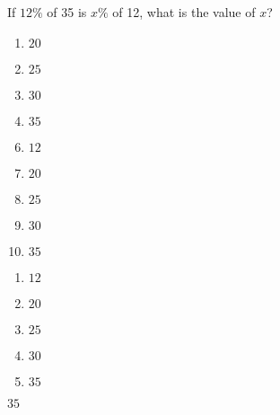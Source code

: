

 If $12\%$ of 35 is $x\%$ of 12, what is the value of $x$?


\ifsat
	\begin{enumerate}[label=\Alph*)]
		\item  $20$
		\item $25$
		\item $30$
		\item  $35$%
	\end{enumerate}
\else
\fi

\ifacteven
	\begin{enumerate}[label=\textbf{\Alph*.},itemsep=\fill,align=left]
		\setcounter{enumii}{5}
		\item   $12$
		\item  $20$
		\item $25$
		\addtocounter{enumii}{1}
		\item $30$
		\item  $35$%
	\end{enumerate}
\else
\fi

\ifactodd
	\begin{enumerate}[label=\textbf{\Alph*.},itemsep=\fill,align=left]
		\item   $12$
		\item  $20$
		\item $25$
		\item $30$
		\item  $35$%
	\end{enumerate}
\else
\fi

\ifgridin
  $35$%

\else
\fi

